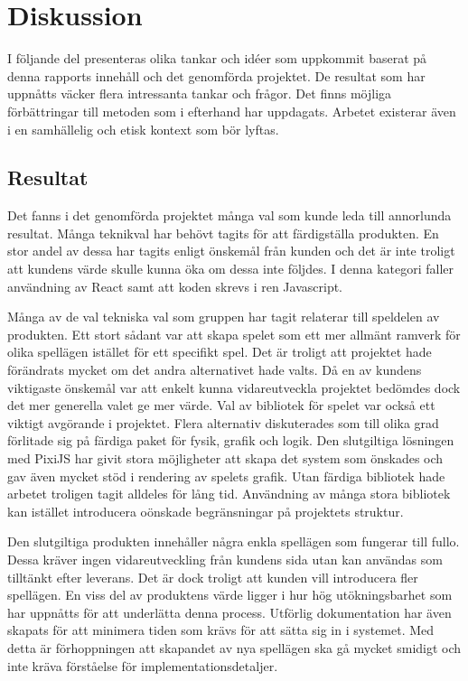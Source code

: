 \chapter{Diskussion}
\label{cha:discussion}

I följande del presenteras olika tankar och idéer som uppkommit baserat på denna rapports innehåll och det genomförda projektet. De resultat som har uppnåtts väcker flera intressanta tankar och frågor. Det finns möjliga förbättringar till metoden som i efterhand har uppdagats. Arbetet existerar även i en samhällelig och etisk kontext som bör lyftas.

\section{Resultat}
\label{sec:discussion-results}

Det fanns i det genomförda projektet många val som kunde leda till annorlunda resultat. Många teknikval har behövt tagits för att färdigställa produkten. En stor andel av dessa har tagits enligt önskemål från kunden och det är inte troligt att kundens värde skulle kunna öka om dessa inte följdes. I denna kategori faller användning av React samt att koden skrevs i ren Javascript.

Många av de val tekniska val som gruppen har tagit relaterar till speldelen av produkten. Ett stort sådant var att skapa spelet som ett mer allmänt ramverk för olika spellägen istället för ett specifikt spel. Det är troligt att projektet hade förändrats mycket om det andra alternativet hade valts. Då en av kundens viktigaste önskemål var att enkelt kunna vidareutveckla projektet bedömdes dock det mer generella valet ge mer värde. Val av bibliotek för spelet var också ett viktigt avgörande i projektet. Flera alternativ diskuterades som till olika grad förlitade sig på färdiga paket för fysik, grafik och logik. Den slutgiltiga lösningen med PixiJS har givit stora möjligheter att skapa det system som önskades och gav även mycket stöd i rendering av spelets grafik. Utan färdiga bibliotek hade arbetet troligen tagit alldeles för lång tid. Användning av många stora bibliotek kan istället introducera oönskade begränsningar på projektets struktur.

Den slutgiltiga produkten innehåller några enkla spellägen som fungerar till fullo. Dessa kräver ingen vidareutveckling från kundens sida utan kan användas som tilltänkt efter leverans. Det är dock troligt att kunden vill introducera fler spellägen. En viss del av produktens värde ligger i hur hög utökningsbarhet som har uppnåtts för att underlätta denna process. Utförlig dokumentation har även skapats för att minimera tiden som krävs för att sätta sig in i systemet. Med detta är förhoppningen att skapandet av nya spellägen ska gå mycket smidigt och inte kräva förståelse för implementationsdetaljer.

